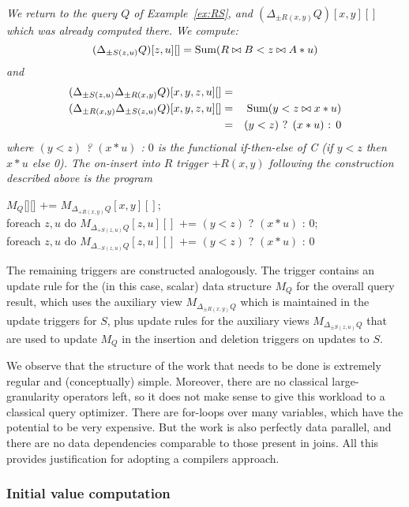 \begin{example}\em
\label{ex:RS2}
We return to the query $Q$ of Example~\ref{ex:RS}, and
$(\Delta_{\pm R(x,y)} Q)[x,y][]$ which was already computed there.
We compute:
\[ (\Delta_{\pm S(z,u)} Q)[z,u][] = \mbox{Sum}(R \bowtie B < z \bowtie A*u) \]
and
\begin{eqnarray*}
(\Delta_{\pm S(z,u)} \Delta_{\pm R(x,y)} Q)[x,y,z,u][] &=& \\
(\Delta_{\pm R(x,y)} \Delta_{\pm S(z,u)} Q)[x,y,z,u][] &=&
\mbox{Sum}(y < z \bowtie x*u) \\
&=& \mbox{$(y<z)$ ? $(x*u)$ : $0$}
\end{eqnarray*}
where $(y<z)$ ? $(x*u)$ : $0$ is the functional if-then-else of C
(if $y<z$ then $x*u$ else 0).
The on-insert into $R$ trigger $+R(x,y)$ following the construction described above is the program
\begin{tabbing}
$M_Q$[][] += $M_{\Delta_{+R(x,y)} Q}[x,y][]$; \\
foreach $z,u$ do $M_{\Delta_{+S(z,u)} Q}[z,u][]$ $+$= $(y<z)$ ? $(x*u)$ : $0$; \\
foreach $z,u$ do $M_{\Delta_{-S(z,u)} Q}[z,u][]$ $+$= $(y<z)$ ? $(x*u)$ : $0$
\end{tabbing}
The remaining triggers are constructed analogously.
The trigger contains an update rule for the (in this case, scalar) data structure $M_Q$ for the overall
query result, which uses the auxiliary view $M_{\Delta_{\pm R(x,y)} Q}$ which is maintained in the update triggers for $S$, plus update rules for the auxiliary views $M_{\Delta_{\pm S(z,u)} Q}$ that are used to update
$M_Q$ in the insertion and deletion triggers on updates to $S$.
\end{example}

We observe that the structure of the work that needs to be done is extremely regular and (conceptually) simple. Moreover,
there are no classical large-granularity operators left, so it does not make sense to give this workload to a classical
query optimizer. There are for-loops over many variables, which have the potential to be very expensive. But the work
is also perfectly data parallel, and there are no data dependencies comparable to those present in joins. All this provides
justification for adopting a compilers approach.


\subsubsection{Initial value computation}


